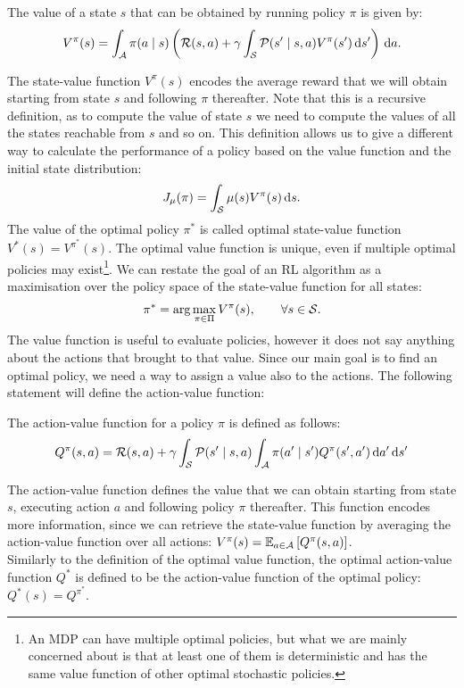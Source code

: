 \begin{definition}
The value of a state $s$ that can be obtained by running policy $\pi$ is given by:
\[
V^{\pi}(s) = \int_{\aspace} \pi(a \mid s) \left( \rfunc(s,a) + \gamma \int_{\sspace} \tfunc(s' \mid s, a) V^{\pi} (s') \de s' \right) \de a.
\]
\end{definition}

The state-value function $V^\pi(s)$ encodes the average reward that we will obtain starting from state $s$ and following $\pi$ thereafter. Note that this is a recursive definition, as to compute the value of state $s$ we need to compute the values of all the states reachable from $s$ and so on. This definition allows us to give a different way to calculate the performance of a policy based on the value function and the initial state distribution:
\[
J_\mu(\pi) = \int_{\sspace}\mu(s)V^\pi(s)\de s.
\]
The value of the optimal policy $\pi^*$ is called optimal state-value function $V^*(s) = V^{\pi^*}(s)$. The optimal value function is unique, even if multiple optimal policies may exist\footnote{An MDP can have multiple optimal policies, but what we are mainly concerned about is that at least one of them is deterministic and has the same value function of other optimal stochastic policies.}. We can restate the goal of an RL algorithm as a maximisation over the policy space of the state-value function for all states:
\[
\pi^* = \arg\max_{\pi \in \Pi} V^\pi(s),\qquad \forall s \in \sspace.
\]
The value function is useful to evaluate policies, however it does not say anything about the actions that brought to that value. Since our main goal is to find an optimal policy, we need a way to assign a value also to the actions. The following statement will define the action-value function:

\begin{definition}
The action-value function for a policy $\pi$ is defined as follows:
\[
Q^{\pi}(s, a) = \rfunc(s, a) + \gamma \int_{\sspace} \tfunc (s' \mid s, a) \int_{\aspace} \pi(a' \mid s') Q^{\pi} (s', a') \de a' \de s'
\]
\end{definition}

The action-value function defines the value that we can obtain starting from state $s$, executing action $a$ and following policy $\pi$ thereafter. This function encodes more information, since we can retrieve the state-value function by averaging the action-value function over all actions: $V^\pi(s) = \EV[a\in\aspace]{Q^\pi(s,a)}$. \\
Similarly to the definition of the optimal value function, the optimal action-value function $Q^*$ is defined to be the action-value function of the optimal policy: $Q^*(s) = Q^{\pi^*}$. 

